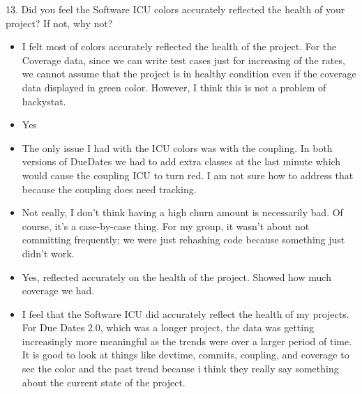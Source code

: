 \documentclass[11pt]{article}
\begin{document}
13. Did you feel the Software ICU colors accurately reflected the health of your project? If not, why not? 
\begin{itemize}
\item I felt most of colors accurately reflected the health of the project. For the Coverage data, since we can write test cases just for increasing of the rates, we cannot assume that the project is in healthy condition even if the coverage data displayed in green color. However, I think this is not a problem of hackystat. 
\item Yes
\item The only issue I had with the ICU colors was with the coupling.  In both versions of DueDates we had to add extra classes at the last minute which would cause the coupling ICU to turn red.  I am not sure how to address that because the coupling does need tracking.
\item Not really, I don't think having a high churn amount is necessarily bad.  Of course, it's a case-by-case thing.  For my group, it wasn't about not committing frequently; we were just rehashing code because something just didn't work.
\item Yes, reflected accurately on the health of the project.  Showed how much coverage we had.
\item I feel that the Software ICU did accurately reflect the health of my projects. For Due Dates 2.0, which was a longer project, the data was getting increasingly more meaningful as the trends were over a larger period of time. It is good to look at things like devtime, commits, coupling, and coverage to see the color and the past trend because i think they really say something about the current state of the project.


\end{itemize}
\end{document}
